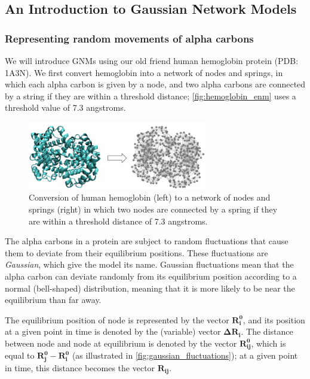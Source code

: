 \FloatBarrier
{}
\subsection{An Introduction to Gaussian Network Models}

\FloatBarrier
{}
\subsubsection{Representing random movements of alpha carbons}

We will introduce GNMs using our old friend human hemoglobin protein (PDB: 1A3N). We first convert hemoglobin into a network of nodes and springs, in which each alpha carbon is given by a node, and two alpha carbons are connected by a string if they are within a threshold distance; \autoref{fig:hemoglobin_enm} uses a threshold value of 7.3 angstroms.

\begin{figure}[h]
	\centering
	\mySfFamily
	\includegraphics[width = 0.7\textwidth]{../images/hemoglobin_enm.png}
	\caption{Conversion of human hemoglobin (left) to a network of nodes and springs (right) in which two nodes are connected by a spring if they are within a threshold distance of 7.3 angstroms.}
	\label{fig:hemoglobin_enm}
\end{figure}

The alpha carbons in a protein are subject to random fluctuations that cause them to deviate from their equilibrium positions. These fluctuations are \textit{Gaussian}, which give the model its name. Gaussian fluctuations mean that the alpha carbon can deviate randomly from its equilibrium position according to a normal (bell-shaped) distribution, meaning that it is more likely to be near the equilibrium than far away.

The equilibrium position of node  is represented by the vector $\mathbf{R_i^0}$, and its position at a given point in time is denoted by the (variable) vector $ \mathbf{\Delta R_i}$. The distance between node  and node  at equilibrium is denoted by the vector $\mathbf{R_{ij}^0}$, which is equal to $\mathbf{R_j^0} - \mathbf{R_i^0}$ (as illustrated in \autoref{fig:gaussian_fluctuations}); at a given point in time, this distance becomes the vector $\mathbf{R_{ij}}$.

